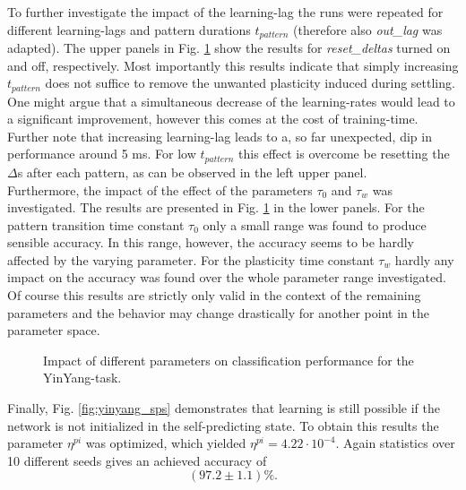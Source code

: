 \documentclass[12pt,a4paper]{article}
\begin{document}
To further investigate the impact of the learning-lag the runs were repeated for different learning-lags and pattern durations $t_{pattern}$ (therefore also \textit{out\_lag} was adapted). 
The upper panels in Fig. \ref{fig:yinyang_vary} show the results for \textit{reset\_deltas} turned on and off, respectively. Most importantly this results indicate that simply increasing $t_{pattern}$ does not suffice to remove the unwanted plasticity induced during settling. One might argue that a simultaneous decrease of the learning-rates would lead to a significant improvement, however this comes at the cost of training-time. Further note that increasing learning-lag leads to a, so far unexpected, dip in performance around 5 ms. For low $t_{pattern}$ this effect is overcome be resetting the $\Delta$s after each pattern, as can be observed in the left upper panel.\\
Furthermore, the impact of the effect of the parameters $\tau_0$ and $\tau_w$ was investigated. The results are presented in Fig. \ref{fig:yinyang_vary} in the lower panels. For the pattern transition time constant $\tau_0$ only a small range was found to produce sensible accuracy. In this range, however, the accuracy seems to be hardly affected by the varying parameter. For the plasticity time constant $\tau_w$ hardly any impact on the accuracy was found over the whole parameter range investigated. Of course this results are strictly only valid in the context of the remaining parameters and the behavior may change drastically for another point in the parameter space. 


\begin{figure}[!ht]
  \centering
  \quad
  \quad
  \quad
  \label{fig:yinyang_vary}
  \caption{Impact of different parameters on classification performance for the YinYang-task.}
\end{figure}

Finally, Fig. \ref{fig:yinyang_sps} demonstrates that learning is still possible if the network is not initialized in the self-predicting state. To obtain this results the parameter $\eta^{pi}$ was optimized, which yielded $\eta^{pi} = 4.22\cdot 10^{-4}$. Again statistics over 10 different seeds gives an achieved accuracy of
\begin{equation*}
(97.2 \pm 1.1)\%.
\end{equation*}
\end{document}
